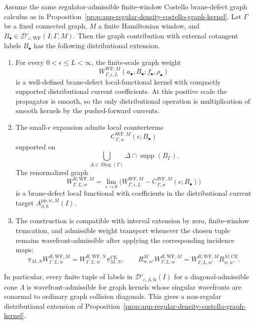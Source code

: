 \begin{prop}
\label{prop:app-wavefront-admissible-costello-graph-kernel}
  Assume the same regulator-admissible finite-window Costello
  brane-defect graph calculus as in
  Proposition~\ref{prop:app-regular-density-costello-graph-kernel}.  Let
  \(\Gamma\) be a fixed connected graph, \(M\) a finite Hamiltonian window,
  and \(B_\bullet\in
  \mathcal D'_{c,\mathrm{WF}}(I;\Gamma,M)\).  Then the graph contribution
  with external cotangent labels \(B_\bullet\) has the following
  distributional extension.
  \begin{enumerate}
    \item For every \(0<\epsilon\leq L<\infty\), the finite-scale graph
    weight
    \[
      W^{\mathrm{WF},M}_{\Gamma,\epsilon,L}
        (a_\bullet,B_\bullet;f_\bullet,\rho_\bullet)
    \]
    is a well-defined brane-defect local-functional kernel with compactly
    supported distributional current coefficients.  At this positive
    scale the propagator is smooth, so the only distributional operation
    is multiplication of smooth kernels by the pushed-forward currents.
    \item The small-\(\epsilon\) expansion admits local counterterms
    \[
      C_{\Gamma,w}^{\mathrm{WF},M}(\epsilon;B_\bullet)
    \]
    supported on
    \[
      \bigcup_{\Delta\in\operatorname{Diag}(\Gamma)}
      \Delta\cap\operatorname{supp}(B_\Gamma).
    \]
    The renormalized graph
    \[
      W^{R,\mathrm{WF},M}_{\Gamma,L,w}
        =
        \lim_{\epsilon\to0}
        \bigl(
          W^{\mathrm{WF},M}_{\Gamma,\epsilon,L}
          -
          C_{\Gamma,w}^{\mathrm{WF},M}(\epsilon;B_\bullet)
        \bigr)
    \]
    is a brane-defect local functional with coefficients in the
    distributional current target
    \(A_{\partial,\hbar}^{\mathrm{pp},w,M}(I)\).
    \item The construction is compatible with interval extension by zero,
    finite-window truncation, and admissible weight transport whenever
    the chosen tuple remains wavefront-admissible after applying the
    corresponding incidence maps:
    \[
      \pi_{M,N}W^{R,\mathrm{WF},M}_{\Gamma,L,w}
        =
      W^{R,\mathrm{WF},N}_{\Gamma,L,w}\pi^{\mathrm{CE}}_{M,N},
      \qquad
      R^M_{w,w'}W^{R,\mathrm{WF},M}_{\Gamma,L,w}
        =
      W^{R,\mathrm{WF},M}_{\Gamma,L,w'}R^{M,\mathrm{CE}}_{w,w'} .
    \]
  \end{enumerate}
  In particular, every finite tuple of labels in
  \(\mathcal D'_{c,\Lambda,\mathrm{fs}}(I)\) for a diagonal-admissible
  cone \(\Lambda\) is wavefront-admissible for graph kernels whose
  singular wavefronts are conormal to ordinary graph collision
  diagonals.  This gives a non-regular distributional extension of
  Proposition~\ref{prop:app-regular-density-costello-graph-kernel}.


\end{prop}
